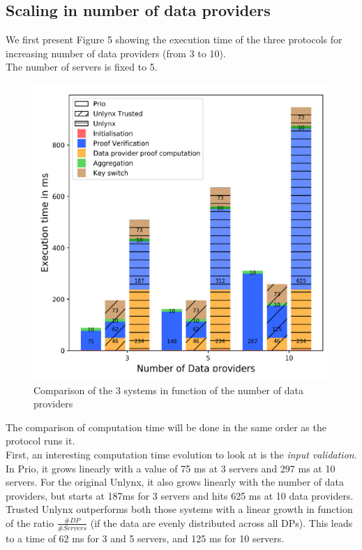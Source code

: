 \documentclass{article}
\begin{document}
\subsection{Scaling in number of data providers}
We first present Figure 5 showing the execution time of the three protocols for increasing number of data providers (from 3 to 10).\\
The number of servers is fixed to 5.
\begin{figure}[H]
\centering
\includegraphics[scale=0.15]{img/ComparisonlinearDP.png}
\caption{Comparison of the 3 systems in function of the number of data providers}
\end{figure}
The comparison of computation time will be done in the same order as the protocol runs it.\\
First, an interesting computation time evolution to look at is the \textit{input validation}. In Prio, it grows linearly with a value of 75 ms at 3 servers and 297 ms at 10 servers. For the original Unlynx, it also grows linearly with the number of data providers, but starts at 187ms for 3 servers and hits 625 ms at 10 data providers. Trusted Unlynx outperforms both those systems with a linear growth in function of the ratio $\frac{\#DP}{\#Servers}$ (if the data are evenly distributed across all DPs). This leads to a time of 62 ms for 3 and 5 servers, and 125 ms for 10 servers.
\end{document}
